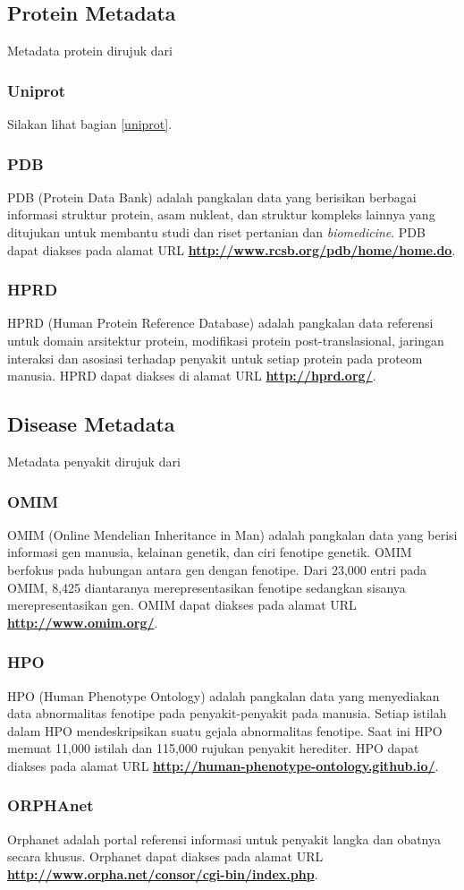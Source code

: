 	\subsection{Protein Metadata}
	Metadata protein dirujuk dari
		\subsubsection{Uniprot}
		Silakan lihat bagian \ref{uniprot}.
		\subsubsection{PDB} \label{pdb}
		PDB (Protein Data Bank) adalah pangkalan data yang berisikan berbagai informasi struktur protein, asam nukleat, dan struktur kompleks lainnya yang ditujukan untuk membantu studi dan riset pertanian dan \emph{biomedicine}. PDB dapat diakses pada alamat URL \textbf{\url{http://www.rcsb.org/pdb/home/home.do}}.
		\subsubsection{HPRD} \label{hprd}
		HPRD (Human Protein Reference Database) adalah pangkalan data referensi untuk domain arsitektur protein, modifikasi protein post-translasional, jaringan interaksi dan asosiasi terhadap penyakit untuk setiap protein pada proteom manusia. HPRD dapat diakses di alamat URL \textbf{\url{http://hprd.org/}}.

	\subsection{Disease Metadata}
	Metadata penyakit dirujuk dari
		\subsubsection{OMIM} \label{omim}
		OMIM (Online Mendelian Inheritance in Man) adalah pangkalan data yang berisi informasi gen manusia, kelainan genetik, dan ciri fenotipe genetik. OMIM berfokus pada hubungan antara gen dengan fenotipe. Dari 23,000 entri pada OMIM, 8,425 diantaranya merepresentasikan fenotipe sedangkan sisanya merepresentasikan gen. OMIM dapat diakses pada alamat URL \textbf{\url{http://www.omim.org/}}.
		\subsubsection{HPO} \label{hpo}
		HPO (Human Phenotype Ontology) adalah pangkalan data yang menyediakan data abnormalitas fenotipe pada penyakit-penyakit pada manusia. Setiap istilah dalam HPO mendeskripsikan suatu gejala abnormalitas fenotipe. Saat ini HPO memuat 11,000 istilah dan 115,000 rujukan penyakit herediter. HPO dapat diakses pada alamat URL \textbf{\url{http://human-phenotype-ontology.github.io/}}.
		\subsubsection{ORPHAnet} \label{orpha}
		Orphanet adalah portal referensi informasi untuk penyakit langka dan obatnya secara khusus. Orphanet dapat diakses pada alamat URL \textbf{\url{http://www.orpha.net/consor/cgi-bin/index.php}}.
